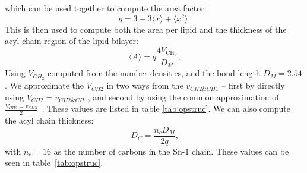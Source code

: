 which can be used together to compute the area factor:
\begin{equation}
q = 3 - 3 \langle x \rangle + \langle x^2 \rangle\text{.}
\end{equation}
This is then used to compute both the area per lipid and the thickness of the acyl-chain region of the lipid bilayer:
\begin{equation}
    \langle A \rangle = q\frac{4V_{\text{CH}_2}}{D_M}\text{,}
\end{equation}
Using $V_{CH_2}$ computed from the number densities, and the bond length $D_M=2.54$.
We approximate the $V_{CH2}$ in two ways from the $v_{CH2\&CH1}$ -- first by directly using $V_{CH2}=v_{CH2\&CH1}$, and
second by using the common approximation of $\frac{V_{CH2}=v_{CH3}}{2}$~\cite{nagle:2000}.
These values are listed in table \ref{tab:opstruc}. We can also compute the acyl chain thickness:
\begin{equation}
    D_C = \frac{n_cD_M}{2q}\text{,}
\end{equation}
with $n_c=16$ as the number of carbons in the Sn-1 chain.
These values can be seen in table~\ref{tab:opstruc}.
